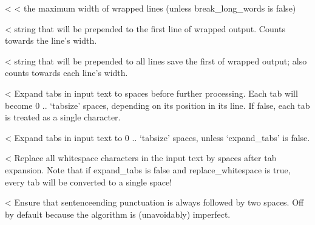 \documentclass[letterpaper,10pt,english]{sphinxmanual}
\begin{document}
\begin{savenotes}
\begin{savenotes}
\begin{savenotes}
\begin{savenotes}
\begin{fulllineitems}
{{{\begin{description}
<%
<%
the maximum width of wrapped lines (unless break\_long\_words
is false)

<%
string that will be prepended to the first line of wrapped
output.  Counts towards the line’s width.

<%
string that will be prepended to all lines save the first
of wrapped output; also counts towards each line’s width.

<%
Expand tabs in input text to spaces before further processing.
Each tab will become 0 .. ‘tabsize’ spaces, depending on its position
in its line.  If false, each tab is treated as a single character.

<%
Expand tabs in input text to 0 .. ‘tabsize’ spaces, unless
‘expand\_tabs’ is false.

<%
Replace all whitespace characters in the input text by spaces
after tab expansion.  Note that if expand\_tabs is false and
replace\_whitespace is true, every tab will be converted to a
single space!

<%
Ensure that sentence\sphinxhyphen{}ending punctuation is always followed
by two spaces.  Off by default because the algorithm is
(unavoidably) imperfect.


\end{description}}}}
\end{fulllineitems}
\end{savenotes}
\end{savenotes}
\end{savenotes}
\end{savenotes}
\end{document}
